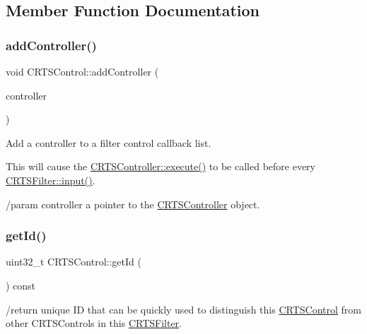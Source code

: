 \subsection{Member Function Documentation}
\mbox{\label{classCRTSControl_a1cbcd31c134d09cb2619fde63e064727}} 
\subsubsection{\texorpdfstring{add\+Controller()}{addController()}}
{\footnotesize\ttfamily void C\+R\+T\+S\+Control\+::add\+Controller (\begin{DoxyParamCaption}\item[{\hyperlink{classCRTSController}{C\+R\+T\+S\+Controller} $\ast$}]{controller }\end{DoxyParamCaption})\hspace{0.3cm}{\ttfamily [inline]}}

Add a controller to a filter control callback list.

This will cause the \hyperlink{classCRTSController_af9d93f0eee3c2d0969c6aaaaf94eb839}{C\+R\+T\+S\+Controller\+::execute()} to be called before every \hyperlink{classCRTSFilter_ab75eb3db5914c0d6b3781439d46b2301}{C\+R\+T\+S\+Filter\+::input()}.

/param controller a pointer to the \hyperlink{classCRTSController}{C\+R\+T\+S\+Controller} object. \mbox{\label{classCRTSControl_acfb6005cbc2d5f22fd4703283c9636bd}} 
\subsubsection{\texorpdfstring{get\+Id()}{getId()}}
{\footnotesize\ttfamily uint32\+\_\+t C\+R\+T\+S\+Control\+::get\+Id (\begin{DoxyParamCaption}\item[{void}]{ }\end{DoxyParamCaption}) const\hspace{0.3cm}{\ttfamily [inline]}}

/return unique ID that can be quickly used to distinguish this \hyperlink{classCRTSControl}{C\+R\+T\+S\+Control} from other C\+R\+T\+S\+Controls in this \hyperlink{classCRTSFilter}{C\+R\+T\+S\+Filter}. \mbox{\label{classCRTSControl_a493557760b3354b32de76fc9f60feaed}} 
